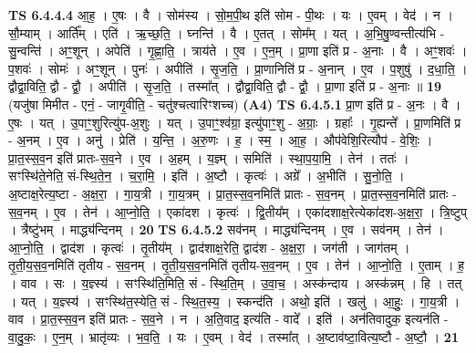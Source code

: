 \documentclass[17pt]{extarticle}
\begin{document}
                  \newline
                                \textbf{ TS 6.4.4.4} \newline
                  आ॒ह॒ । ए॒षः । वै । सोम॑स्य । सो॒म॒पी॒थ इति॑ सोम - पी॒थः । यः । ए॒वम् । वेद॑ । न । सौ॒म्याम् । आर्ति᳚म् । एति॑ । ऋ॒च्छ॒ति॒ । घ्नन्ति॑ । वै । ए॒तत् । सोम᳚म् । यत् । अ॒भि॒षु॒ण्वन्तीत्य॑भि - सु॒न्वन्ति॑ । अꣳ॒॒शून् । अपेति॑ । गृ॒ह्णा॒ति॒ । त्राय॑ते । ए॒व । ए॒न॒म् । प्रा॒णा इति॑ प्र - अ॒नाः । वै । अꣳ॒॒शवः॑ । प॒शवः॑ । सोमः॑ । अꣳ॒॒शून् । पुनः॑ । अपीति॑ । सृ॒ज॒ति॒ । प्रा॒णानिति॑ प्र - अ॒नान् । ए॒व । प॒शुषु॑ । द॒धा॒ति॒ । द्वौद्वा॒विति॒ द्वौ - द्वौ॒ । अपीति॑ । सृ॒ज॒ति॒ । तस्मा᳚त् । द्वौद्वा॒विति॒ द्वौ - द्वौ॒ । प्रा॒णा इति॑ प्र - अ॒नाः ॥ \textbf{  19} \newline
                  \newline
                      (यजु॑षा मिमीत - एनं॒ - जागृ॒वीति॒ - चतु॑श्चत्वारिꣳशच्च)  \textbf{(A4)} \newline \newline
                                \textbf{ TS 6.4.5.1} \newline
                  प्रा॒ण इति॑ प्र - अ॒नः । वै । ए॒षः । यत् । उ॒पाꣳ॒॒शुरित्यु॑प-अ॒शुः । यत् । उ॒पाꣳ॒॒श्व॑ग्रा॒ इत्यु॑पाꣳ॒॒शु - अ॒ग्राः॒ । ग्रहाः᳚ । गृ॒ह्यन्ते᳚ । प्रा॒णमिति॑ प्र - अ॒नम् । ए॒व । अनु॑ । प्रेति॑ । य॒न्ति॒ । अ॒रु॒णः । ह॒ । स्म॒ । आ॒ह॒ । औप॑वेशि॒रित्यौप॑ - वे॒शिः॒ । प्रा॒त॒स्स॒व॒न इति॑ प्रातः-स॒व॒ने । ए॒व । अ॒हम् । य॒ज्ञ्म् । समिति॑ । स्था॒प॒या॒मि॒ । तेन॑ । ततः॑ । सꣳस्थि॑ते॒नेति॒ सं-स्थि॒ते॒न॒ । च॒रा॒मि॒ । इति॑ । अ॒ष्टौ । कृत्वः॑ । अग्रे᳚ । अ॒भीति॑ । सु॒नो॒ति॒ । अ॒ष्टाक्ष॒रेत्य॒ष्टा - अ॒क्ष॒रा॒ । गा॒य॒त्री । गा॒य॒त्रम् । प्रा॒त॒स्स॒व॒नमिति॑ प्रातः - स॒व॒नम् । प्रा॒त॒स्स॒व॒नमिति॑ प्रातः - स॒व॒नम् । ए॒व । तेन॑ । आ॒प्नो॒ति॒ । एका॑दश । कृत्वः॑ । द्वि॒तीय᳚म् । एका॑दशाक्ष॒रेत्येका॑दश-अ॒क्ष॒रा॒ । त्रि॒ष्टुप् । त्रैष्टु॑भम् । माद्ध्य॑न्दिनम् । \textbf{  20} \newline
                  \newline
                                \textbf{ TS 6.4.5.2} \newline
                  सव॑नम् । माद्ध्य॑न्दिनम् । ए॒व । सव॑नम् । तेन॑ । आ॒प्नो॒ति॒ । द्वाद॑श । कृत्वः॑ । तृ॒तीय᳚म् । द्वाद॑शाक्ष॒रेति॒ द्वाद॑श - अ॒क्ष॒रा॒ । जग॑ती । जाग॑तम् । तृ॒ती॒य॒स॒व॒नमिति॑ तृतीय - स॒व॒नम् । तृ॒ती॒य॒स॒व॒नमिति॑ तृतीय-स॒व॒नम् । ए॒व । तेन॑ । आ॒प्नो॒ति॒ । ए॒ताम् । ह॒ । वाव । सः । य॒ज्ञ्स्य॑ । सꣳस्थि॑ति॒मिति॒ सं - स्थि॒ति॒म् । उ॒वा॒च॒ । अस्क॑न्दाय । अस्क॑न्नम् । हि । तत् । यत् । य॒ज्ञ्स्य॑ । सꣳस्थि॑त॒स्येति॒ सं - स्थि॒त॒स्य॒ । स्कन्द॑ति । अथो॒ इति॑ । खलु॑ । आ॒हुः॒ । गा॒य॒त्री । वाव । प्रा॒त॒स्स॒व॒न इति॑ प्रातः - स॒व॒ने । न । अ॒ति॒वाद॒ इत्य॑ति - वादे᳚ । इति॑ । अन॑तिवादुक॒ इत्यन॑ति - वा॒दु॒कः॒ । ए॒न॒म् । भ्रातृ॑व्यः । भ॒व॒ति॒ । यः । ए॒वम् । वेद॑ । तस्मा᳚त् । अ॒ष्टाव॑ष्टा॒वित्य॒ष्टौ - अ॒ष्टौ॒ । \textbf{  21} \newline
\end{document}
